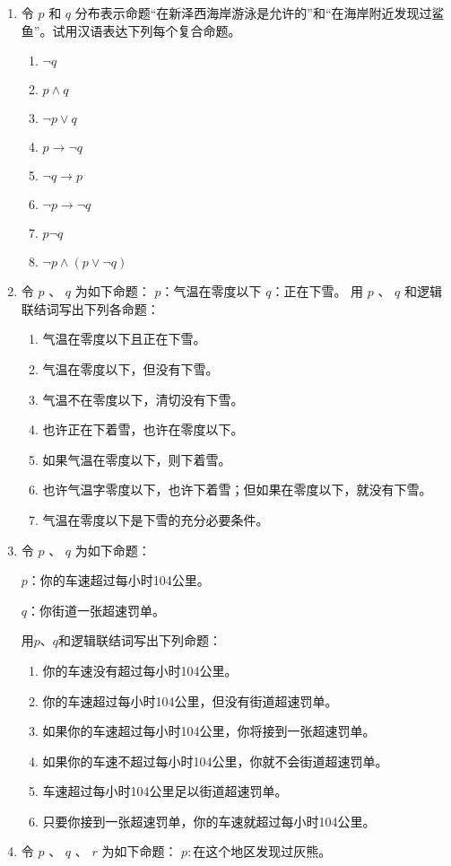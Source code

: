 \begin{enumerate}
	\item
		令
		$p$
		和
		$q$
		分布表示命题“在新泽西海岸游泳是允许的”和“在海岸附近发现过鲨鱼”。试用汉语表达下列每个复合命题。
		\begin{enumerate}
			\item	$\neg q$
			\item	$p \land q$
			\item	$\neg p \lor q$
			\item	$p \to \neg q$
			\item	$\neg q \to p$
			\item	$\neg p \to \neg q$
			\item	$p \neg q$
			\item	$\neg p \land (p \lor \neg q)$
		\end{enumerate}
	\item
		令
		$p$
		、
		$q$
		为如下命题：
		$p$：气温在零度以下
		$q$：正在下雪。
		用
		$p$
		、
		$q$
		和逻辑联结词写出下列各命题：
		\begin{enumerate}
			\item	气温在零度以下且正在下雪。
			\item	气温在零度以下，但没有下雪。
			\item	气温不在零度以下，清切没有下雪。
			\item	也许正在下着雪，也许在零度以下。
			\item	如果气温在零度以下，则下着雪。
			\item	也许气温字零度以下，也许下着雪；但如果在零度以下，就没有下雪。
			\item	气温在零度以下是下雪的充分必要条件。
		\end{enumerate}
	\item
		令
		$p$
		、
		$q$
		为如下命题：

		$p$：你的车速超过每小时104公里。

		$q$：你街道一张超速罚单。

		用$p$、$q$和逻辑联结词写出下列命题：
		\begin{enumerate}
			\item	你的车速没有超过每小时104公里。
			\item	你的车速超过每小时104公里，但没有街道超速罚单。
			\item	如果你的车速超过每小时104公里，你将接到一张超速罚单。
			\item	如果你的车速不超过每小时104公里，你就不会街道超速罚单。
			\item	车速超过每小时104公里足以街道超速罚单。
			\item	只要你接到一张超速罚单，你的车速就超过每小时104公里。
		\end{enumerate}
	\item
		令
		$p$
		、
		$q$
		、
		$r$
		为如下命题：
		$p:$在这个地区发现过灰熊。


\end{enumerate}
